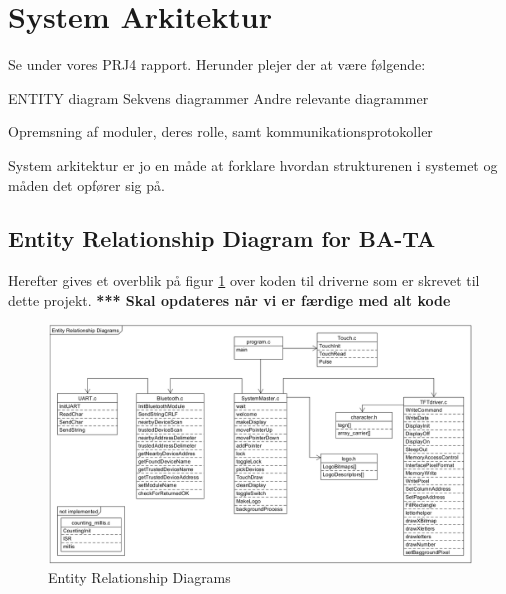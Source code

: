 \graphicspath{{Chapters/SystemArkitektur/}}

\section{System Arkitektur}

Se under vores PRJ4 rapport.
Herunder plejer der at være følgende:


ENTITY diagram
Sekvens diagrammer
Andre relevante diagrammer

Opremsning af moduler, deres rolle, samt kommunikationsprotokoller

System arkitektur er jo en måde at forklare hvordan strukturenen i systemet og måden det opfører sig på.

\subsection{Entity Relationship Diagram for BA-TA}
Herefter gives et overblik på figur \ref{fig:Entity} over koden til driverne som er skrevet til dette projekt.
\textbf{*** Skal opdateres når vi er færdige med alt kode}

\begin{figure}[H]
	\centering
	\includegraphics[width = 300 pt]{Img/Entity.png}
	\caption{Entity Relationship Diagrams}
	\label{fig:Entity}
\end{figure}